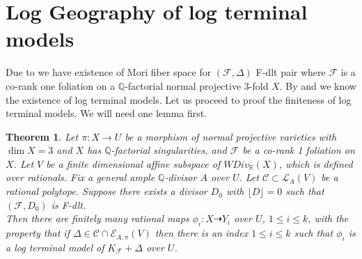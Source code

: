 \documentclass[12pt]{amsart}%
\theoremstyle{plain}
\newtheorem{theorem}{Theorem}[section]
\theoremstyle{remark}
\theoremstyle{definition}
\newcommand{\<}{\leq}
\newcommand{\mbQ}{\mathbb{Q}}
\newcommand{\mbR}{\mathbb{R}}
\def\dim{\operatorname{dim}}
\theoremstyle{definition}
\theoremstyle{definition}
\numberwithin{equation}{section}
\theoremstyle{remark}
\begin{document}
\section{Log Geography of log terminal models}
Due to \cite[Theorem $2.1$]{SS19} we have existence of Mori fiber space for $(\mathcal{F},\Delta)$ F-dlt pair where $\mathcal{F}$ is a co-rank one foliation on a $\mbQ$-factorial normal projective $3$-fold $X$. By \cite[Theorem $1.2$]{CS21} and \cite[Theorem $2.6$]{SS19} we know the existence of log terminal models. Let us proceed to proof the finiteness of log terminal models. We will need one lemma first.
\begin{theorem}\label{Finiteness}
 Let $\pi:X\rightarrow U$ be a morphism of normal projective varieties with $\dim X=3$ and $X$ has $\mbQ$-factorial singularities, and $\mathcal{F}$ be a co-rank 1 foliation on $X$. Let $V$ be a finite dimensional affine subspace of $WDiv_{\mbR}(X)$, which is defined over rationals. Fix a general ample $\mbQ$-divisor $A$ over $U$. Let $\mathcal{C}\subset \mathcal{L}_A(V)$ be a rational polytope. Suppose there exists a divisor $D_0$ with $\lfloor D\rfloor=0$ such that $(\mathcal{F},D_0)$ is F-dlt.\\
 Then there are finitely many rational maps $\phi_i:X\dashrightarrow Y_i$ over $U$, $1\leqslant i\leqslant k$, with the property that if $\Delta\in \mathcal{C}\cap \mathcal{E}_{A,\pi}(V)$ then there is an index $1\leqslant i\leqslant k$ such that $\phi_i$ is a log terminal model of $K_{\mathcal{F}}+\Delta$ over $U$.    
\end{theorem}
\end{document}
